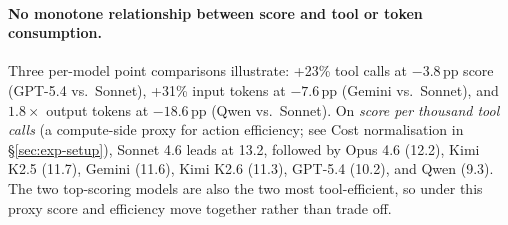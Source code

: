 \paragraph{No monotone relationship between score and tool or token consumption.} Three per-model point comparisons illustrate: +23\% tool calls at $-3.8$\,pp score (GPT-5.4 vs.\ Sonnet), +31\% input tokens at $-7.6$\,pp (Gemini vs.\ Sonnet), and $1.8\times$ output tokens at $-18.6$\,pp (Qwen vs.\ Sonnet). On \emph{score per thousand tool calls} (a compute-side proxy for action efficiency; see Cost normalisation in \S\ref{sec:exp-setup}), Sonnet 4.6 leads at 13.2, followed by Opus 4.6 (12.2), Kimi K2.5 (11.7), Gemini (11.6), Kimi K2.6 (11.3), GPT-5.4 (10.2), and Qwen (9.3). The two top-scoring models are also the two most tool-efficient, so under this proxy score and efficiency move together rather than trade off.



\label{sec:exp-scenario}
